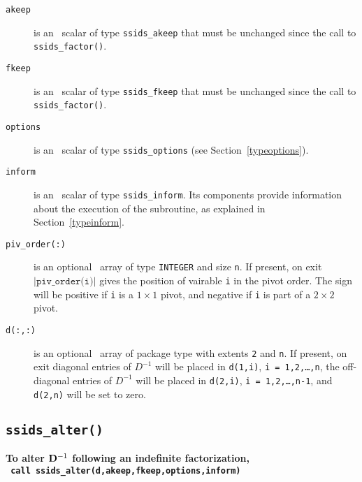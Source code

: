\documentclass{spral}
\begin{document}
\begin{description}

\item[\texttt{akeep}]  is an \intentin\ scalar of type {\tt ssids\_akeep} that
must be unchanged since the call to {\tt ssids\_factor()}.

\item[\texttt{fkeep}]  is an \intentin\ scalar of type {\tt ssids\_fkeep} that
must be unchanged since the call to {\tt ssids\_factor()}.

\item[\texttt{options}] is an \intentin\ scalar of type {\tt ssids\_options}
(see Section~\ref{typeoptions}).

\item[\texttt{inform}] is an \intentout\ scalar of type
{\tt ssids\_inform}. Its components provide information about the execution
of the subroutine, as explained in Section~\ref{typeinform}.

\item[\texttt{piv\_order(:)}] is an optional \intentout\ array of type
{\tt INTEGER} and size {\tt n}. If present, on exit
$|\texttt{piv\_order(i)}|$ gives the position of vairable {\tt i} in the pivot
order. The sign will be positive if {\tt i} is a $1\times1$ pivot, and negative
if {\tt i} is part of a $2 \times 2$ pivot.

\item[\texttt{d(:,:)}] is an optional \intentout\ array of package type with
extents {\tt 2} and {\tt n}.
If present, on exit diagonal entries of ${D}^{-1}$ will be placed
in {\tt d(1,i)}, {\tt i = 1,2,\ldots,n},
the off-diagonal entries  of ${D}^{-1}$ will be placed in
{\tt d(2,i)}, {\tt i = 1,2,\ldots,n-1}, and
{\tt d(2,n)} will be set to zero.

\end{description}



\subsection{\texttt{ssids\_alter()}}
\textbf{To alter ${\bf D}^{-1}$ following an indefinite factorization,
   \vspace*{0.1cm} \\
   \texttt{ \hspace*{0.2cm}
      call ssids\_alter(d,akeep,fkeep,options,inform)
   }
}
\end{document}

